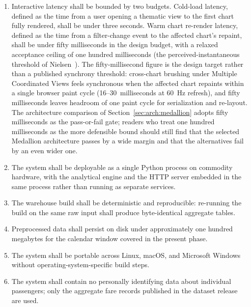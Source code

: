 \begin{enumerate}
  \item[\textbf{N1.}] Interactive latency shall be bounded by two budgets. Cold-load latency, defined as the time from a user opening a thematic view to the first chart fully rendered, shall be under three seconds. Warm chart re-render latency, defined as the time from a filter-change event to the affected chart's repaint, shall be under fifty milliseconds in the design budget, with a relaxed acceptance ceiling of one hundred milliseconds (the perceived-instantaneous threshold of Nielsen~\cite{nielsen1993usability}). The fifty-millisecond figure is the design target rather than a published synchrony threshold: cross-chart brushing under Multiple Coordinated Views feels synchronous when the affected chart repaints within a single browser paint cycle (16--30~milliseconds at 60~Hz refresh), and fifty milliseconds leaves headroom of one paint cycle for serialization and re-layout. The architecture comparison of Section~\ref{sec:arch:medallion} adopts fifty milliseconds as the pass-or-fail gate; readers who treat one hundred milliseconds as the more defensible bound should still find that the selected Medallion architecture passes by a wide margin and that the alternatives fail by an even wider one.
  \item[\textbf{N2.}] The system shall be deployable as a single Python process on commodity hardware, with the analytical engine and the HTTP server embedded in the same process rather than running as separate services.
  \item[\textbf{N3.}] The warehouse build shall be deterministic and reproducible: re-running the build on the same raw input shall produce byte-identical aggregate tables.
  \item[\textbf{N4.}] Preprocessed data shall persist on disk under approximately one hundred megabytes for the calendar window covered in the present phase.
  \item[\textbf{N5.}] The system shall be portable across Linux, macOS, and Microsoft Windows without operating-system-specific build steps.
  \item[\textbf{N6.}] The system shall contain no personally identifying data about individual passengers; only the aggregate fare records published in the dataset release are used.
\end{enumerate}

